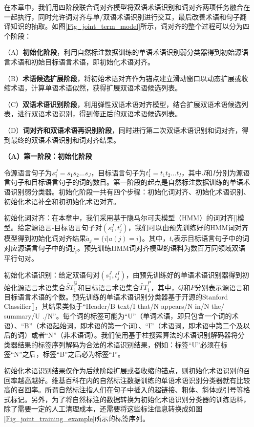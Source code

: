 在本章中，我们用四阶段联合词对齐模型将双语术语识别和词对齐两项任务融合在一起执行，同时允许词对齐与单/双语术语识别进行交互，最后改善术语和句子翻译知识的抽取。如图\ref{Fig_joint_term_model}所示，词对齐的整个过程可以分为四个阶段：

（A）\textbf{初始化阶段}，利用自然标注数据训练的单语术语识别弱分类器得到初始源语言术语和初始目标语言术语，即初始化术语对齐。

（B）\textbf{术语候选扩展阶段}，将初始术语对齐作为锚点建立滑动窗口以动态扩展或收缩术语，计算单语术语似然，获得扩展双语术语候选列表。

（C）\textbf{双语术语识别阶段}，利用弹性双语术语对齐模型，结合扩展双语术语候选列表，进行双语术语识别，得到修正后的双语术语候选列表。

（D）\textbf{词对齐和双语术语再识别阶段}，同时进行第二次双语术语识别和词对齐，得到最终的双语术语识别和词对齐结果。

\textbf{（A）第一阶段：初始化阶段}

令源语言句子为$ s_1^J=s_1s_2\ldots s_J$，目标语言句子为$ t_1^I=t_1 t_2\ldots t_I$，其中$J$和$I$分别为源语言句子和目标语言句子的词的数目。第一阶段的起点是自然标注数据训练的单语术语识别弱分类器。初始化阶段一共有四个步骤：初始化词对齐、初始化术语识别、初始化术语补全和初初始化术语对齐。

初始化词对齐：在本章中，我们采用基于隐马尔可夫模型（HMM）的词对齐[\cite{Vogel:1996}]模型。给定源语言-目标语言句子对$(s_1^J,t_j^I)$，我们可以由预先训练好的HMM词对齐模型得到初始化词对齐结果$\tilde{a}_j=\{i|a(j)=i\}$。其中，$t_i$表示目标语言句子中的词 对应源语言句子中的词$j_i$。预先训练HMM词对齐模型的语料为数百万同领域双语平行句对。

初始化术语识别：给定双语句对$(s_1^J,t_j^I)$，由预先训练好的单语术语识别器得到初始化源语言术语集合$\widetilde{ST}_1^Q$和目标语言术语集合$\widetilde{TT}_1^P$，其中，$Q$和$P$分别表示源语言和目标语言术语的个数。预先训练的单语术语识别分类器基于开源的Stanford Classifier[\cite{Manning:2003}]，其结果类似于“Header/B text/I that/N appears/N in/N the/ summary/U ./N”。每个词的标签可能为“U”（单词术语，即只包含一个词的术语）、“B”（术语起始词，即术语的第一个词）、“I”（术语词，即术语中第二个及以后的词）或者“N”（非术语词）。我们使用基于柱搜索算法的术语识别解码器将分类器结果的标签序列解码为合法的术语识别结果，例如：标签“U”必须在标签“N”之后，标签“B”之后必为标签“I”。

初始化术语识别结果仅作为后续阶段扩展或者收缩的锚点，则初始化术语识别的召回率越高越好。维基百科在内的自然标注数据训练的单语术语识别分类器就有比较高的召回率。所谓自然标注指人们在句子中插入的超链接、粗体、斜体或引号等格式标记。另外，为了将自然标注的数据转换为初始化术语识别分类器的训练语料，除了需要一定的人工清理成本，还需要将这些标注信息转换成如图\ref{Fig_joint_training_example}所示的标签序列。

